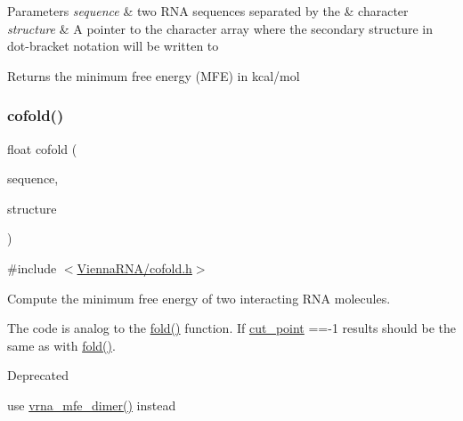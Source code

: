 \begin{DoxyParams}{Parameters}
{\em sequence} & two R\+NA sequences separated by the \textquotesingle{}\&\textquotesingle{} character \\
\hline
{\em structure} & A pointer to the character array where the secondary structure in dot-\/bracket notation will be written to \\
\hline
\end{DoxyParams}
\begin{DoxyReturn}{Returns}
the minimum free energy (M\+FE) in kcal/mol 
\end{DoxyReturn}
\mbox{\label{group__mfe__cofold_gabc8517f22cfe70595ee81fc837910d52}} 
\subsubsection{\texorpdfstring{cofold()}{cofold()}}
{\footnotesize\ttfamily float cofold (\begin{DoxyParamCaption}\item[{const char $\ast$}]{sequence,  }\item[{char $\ast$}]{structure }\end{DoxyParamCaption})}



{\ttfamily \#include $<$\mbox{\hyperlink{cofold_8h}{Vienna\+R\+N\+A/cofold.\+h}}$>$}



Compute the minimum free energy of two interacting R\+NA molecules. 

The code is analog to the \mbox{\hyperlink{group__mfe__fold__single_gaadafcb0f140795ae62e5ca027e335a9b}{fold()}} function. If \mbox{\hyperlink{fold__vars_8h_ab9b2c3a37a5516614c06d0ab54b97cda}{cut\+\_\+point}} ==-\/1 results should be the same as with \mbox{\hyperlink{group__mfe__fold__single_gaadafcb0f140795ae62e5ca027e335a9b}{fold()}}.

\begin{DoxyRefDesc}{Deprecated}
\item[\mbox{\hyperlink{deprecated__deprecated000030}{Deprecated}}]use \mbox{\hyperlink{group__mfe__cofold_gaab22d10c1190f205f16a77cab9d5d3ee}{vrna\+\_\+mfe\+\_\+dimer()}} instead\end{DoxyRefDesc}



